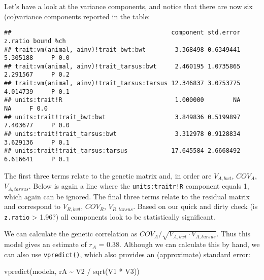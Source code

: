 \documentclass[
  12pt,
]{book}
\newenvironment{Shaded}{\begin{snugshade}}{\end{snugshade}}
\newcommand{\FunctionTok}[1]{\textcolor[rgb]{0.00,0.00,0.00}{#1}}
\newcommand{\NormalTok}[1]{#1}
\newcommand{\SpecialCharTok}[1]{\textcolor[rgb]{0.00,0.00,0.00}{#1}}
\begin{document}
Let's have a look at the variance components, and notice that there are now six (co)variance components reported in the table:

\begin{Shaded}
\end{Shaded}

\begin{verbatim}
##                                            component std.error  z.ratio bound %ch
## trait:vm(animal, ainv)!trait_bwt:bwt        3.368498 0.6349441 5.305188     P 0.0
## trait:vm(animal, ainv)!trait_tarsus:bwt     2.460195 1.0735865 2.291567     P 0.2
## trait:vm(animal, ainv)!trait_tarsus:tarsus 12.346837 3.0753775 4.014739     P 0.1
## units:trait!R                               1.000000        NA       NA     F 0.0
## units:trait!trait_bwt:bwt                   3.849836 0.5199897 7.403677     P 0.0
## units:trait!trait_tarsus:bwt                3.312978 0.9128834 3.629136     P 0.1
## units:trait!trait_tarsus:tarsus            17.645584 2.6668492 6.616641     P 0.1
\end{verbatim}

The first three terms relate to the genetic matrix and, in order are \(V_{A,bwt}\), \(COV_A\), \(V_{A, tarsus}\). Below is again a line where the \texttt{units:traitr!R} component equals 1, which again can be ignored. The final three terms relate to the residual matrix and correspond to \(V_{R,bwt}\), \(COV_R\), \(V_{R,tarsus}\). Based on our quick and dirty check (is \texttt{z.ratio} \textgreater{} 1.96?) all components look to be statistically significant.

We can calculate the genetic correlation as \(COV_A / \sqrt{V_{A,bwt} \cdot V_{A,tarsus}}\). Thus this model gives an estimate of \(r_A\) = 0.38. Although we can calculate this by hand, we can also use \texttt{vpredict()}, which also provides an (approximate) standard error:

\begin{Shaded}
\begin{Highlighting}[]
\FunctionTok{vpredict}\NormalTok{(modela, rA }\SpecialCharTok{\textasciitilde{}}\NormalTok{ V2 }\SpecialCharTok{/} \FunctionTok{sqrt}\NormalTok{(V1 }\SpecialCharTok{*}\NormalTok{ V3))}
\end{Highlighting}
\end{Shaded}
\end{document}
